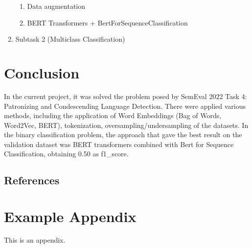 \documentclass[11pt]{article}
\begin{document}
\begin{enumerate}
\begin{enumerate}
\item Data augmentation


\item BERT Transformers + BertForSequenceClassification

\end{enumerate}

\item Subtask 2 (Multiclass Classification)
\end{enumerate}

\section{Conclusion}

In the current project, it was solved the problem posed by SemEval 2022 Task
4: Patronizing and Condescending Language Detection. There were applied
various methods, including the application of Word Embeddings (Bag of Words,
Word2Vec, BERT), tokenization, oversampling/undersampling of the datasets.
In the binary classification problem, the approach that gave the best result
on the validation dataset was BERT transformers combined with Bert for
Sequence Classification, obtaining 0.50 as f1\_score.

\subsection{References}

\appendix

\section{Example Appendix}

\label{sec:appendix}

This is an appendix.
\end{document}
